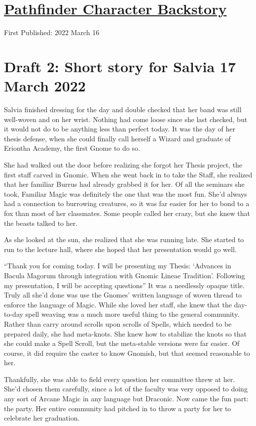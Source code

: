 \documentclass[12pt]{article}[titlepage]
\newcommand{\say}[1]{``#1''}
\newcommand{\nsay}[1]{`#1'}
\renewcommand{\,}{\textsuperscript{,}}
\begin{document}
\doublespacing
\section{\href{pathfinder-0-1.html}{Pathfinder Character Backstory}}
First Published: 2022 March 16

\section{Draft 2: Short story for Salvia 17 March 2022}
Salvia finished dressing for the day and double checked that her band was still well-woven and on her wrist.
Nothing had come loose since she last checked, but it would not do to be anything less than perfect today.
It was the day of her thesis defense, when she could finally call herself a Wizard and graduate of Eriontha Academy, the first Gnome to do so.

She had walked out the door before realizing she forgot her Thesis project, the first staff carved in Gnomic.
When she went back in to take the Staff, she realized that her familiar Burrus had already grabbed it for her.
Of all the seminars she took, Familiar Magic was definitely the one that was the most fun.
She'd always had a connection to burrowing creatures, so it was far easier for her to bond to a fox than most of her classmates.
Some people called her crazy, but she knew that the beasts talked to her.

As she looked at the sun, she realized that she was running late.
She started to run to the lecture hall, where she hoped that her presentation would go well.

\say{Thank you for coming today.
I will be presenting my Thesis: \nsay{Advances in Bacula Magorum through integration with Gnomic Lineae Tradition}.
Following my presentation, I will be accepting questions}
It was a needlessly opaque title.
Truly all she'd done was use the Gnomes' written language of woven thread to enforce the language of Magic.
While she loved her staff, she knew that the day-to-day spell weaving was a much more useful thing to the general community.
Rather than carry around scrolls upon scrolls of Spells, which needed to be prepared daily, she had meta-knots.
She knew how to stabilize the knots so that she could make a Spell Scroll, but the meta-stable versions were far easier.
Of course, it did require the caster to know Gnomish, but that seemed reasonable to her.

Thankfully, she was able to field every question her committee threw at her.
She'd chosen them carefully, since a lot of the faculty was very opposed to doing any sort of Arcane Magic in any language but Draconic.
Now came the fun part: the party.
Her entire community had pitched in to throw a party for her to celebrate her graduation.
\end{document}

